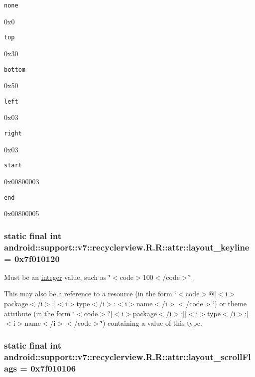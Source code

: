 {\tt none}

0x0

{\tt top}

0x30

{\tt bottom}

0x50

{\tt left}

0x03

{\tt right}

0x03

{\tt start}

0x00800003

{\tt end}

0x00800005\hypertarget{classandroid_1_1support_1_1v7_1_1recyclerview_1_1_r_1_1attr_ac445006cc012145181b4240e3a08f25}{
\subsubsection[{layout\_\-keyline}]{\setlength{\rightskip}{0pt plus 5cm}static final int android::support::v7::recyclerview.R.R::attr::layout\_\-keyline = 0x7f010120}}
\label{classandroid_1_1support_1_1v7_1_1recyclerview_1_1_r_1_1attr_ac445006cc012145181b4240e3a08f25}


Must be an \hyperlink{classandroid_1_1support_1_1v7_1_1recyclerview_1_1_r_1_1integer}{integer} value, such as \char`\"{}$<$code$>$100$<$/code$>$\char`\"{}. 

This may also be a reference to a resource (in the form \char`\"{}$<$code$>$@\mbox{[}$<$i$>$package$<$/i$>$:\mbox{]}$<$i$>$type$<$/i$>$:$<$i$>$name$<$/i$>$$<$/code$>$\char`\"{}) or theme attribute (in the form \char`\"{}$<$code$>$?\mbox{[}$<$i$>$package$<$/i$>$:\mbox{]}\mbox{[}$<$i$>$type$<$/i$>$:\mbox{]}$<$i$>$name$<$/i$>$$<$/code$>$\char`\"{}) containing a value of this type. \hypertarget{classandroid_1_1support_1_1v7_1_1recyclerview_1_1_r_1_1attr_9b292fe976f2043a0552be25f87b7bbb}{
\subsubsection[{layout\_\-scrollFlags}]{\setlength{\rightskip}{0pt plus 5cm}static final int android::support::v7::recyclerview.R.R::attr::layout\_\-scrollFlags = 0x7f010106}}
\label{classandroid_1_1support_1_1v7_1_1recyclerview_1_1_r_1_1attr_9b292fe976f2043a0552be25f87b7bbb}


